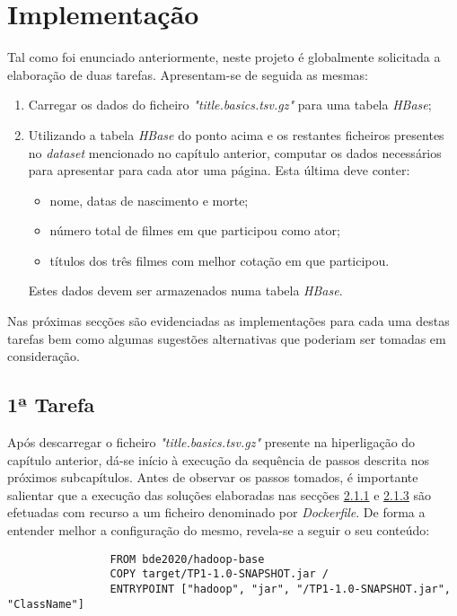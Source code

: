 \documentclass[a4paper]{report}
\begin{document}
\chapter{Implementação}
\large {
	Tal como foi enunciado anteriormente, neste projeto é globalmente solicitada a elaboração de duas tarefas. Apresentam-se de seguida as mesmas:
	\begin{enumerate}
		\item Carregar os dados do ficheiro \textit{"title.basics.tsv.gz"} para uma tabela \textit{HBase};
		\item Utilizando a tabela \textit{HBase} do ponto acima e os restantes ficheiros presentes no \textit{dataset} mencionado no capítulo anterior, computar os dados necessários para apresentar para cada ator uma página. Esta última deve conter:
		\begin{itemize}
			\item nome, datas de nascimento e morte;
			\item número total de filmes em que participou como ator;
			\item títulos dos três filmes com melhor cotação em que participou.
		\end{itemize}
		Estes dados devem ser armazenados numa tabela \textit{HBase}.
	\end{enumerate}
	
	Nas próximas secções são evidenciadas as implementações para cada uma destas tarefas bem como algumas sugestões alternativas que poderiam ser tomadas em consideração.
	\section{1ª Tarefa} \label{job1}
		Após descarregar o ficheiro \textit{"title.basics.tsv.gz"} presente na hiperligação do capítulo anterior, dá-se início à execução da sequência de passos descrita nos próximos subcapítulos.
		Antes de observar os passos tomados, é importante salientar que a execução das soluções elaboradas nas secções \hyperref[job1-1]{2.1.1} e \hyperref[job1-3]{2.1.3} são efetuadas com recurso a um ficheiro denominado por \textit{Dockerfile}. De forma a entender melhor a configuração do mesmo, revela-se a seguir o seu conteúdo:
		{
			\color{teal}
            \begin{verbatim}
			    FROM bde2020/hadoop-base
			    COPY target/TP1-1.0-SNAPSHOT.jar /
			    ENTRYPOINT ["hadoop", "jar", "/TP1-1.0-SNAPSHOT.jar", "ClassName"]
			\end{verbatim}
        }
        
}
\end{document}
